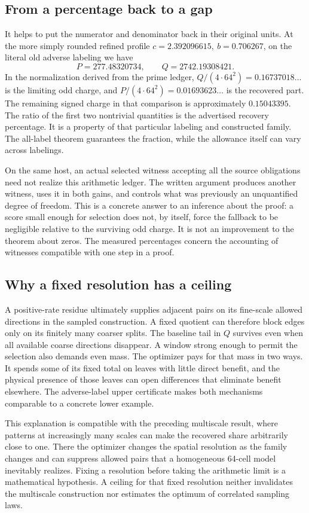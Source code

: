 \subsection{From a percentage back to a gap}
It helps to put the numerator and denominator back in their original units. At the more simply rounded refined profile \(c=2.392096615,\ b=0.706267\), on the literal old adverse labeling we have
\[
     P=277.48320734,\qquad Q=2742.19308421 .
\]
In the normalization derived from the prime ledger, \(Q/(4\cdot64^2)=0.16737018\ldots\) is the limiting odd charge, and \(P/(4\cdot64^2)=0.01693623\ldots\) is the recovered part. The remaining signed charge in that comparison is approximately \(0.15043395\). The ratio of the first two nontrivial quantities is the advertised recovery percentage. It is a property of that particular labeling and constructed family. The all-label theorem guarantees the fraction, while the allowance itself can vary across labelings.

On the same host, an actual selected witness accepting all the source obligations need not realize this arithmetic ledger. The written argument produces another witness, uses it in both gains, and controls what was previously an unquantified degree of freedom. This is a concrete answer to an inference about the proof: a score small enough for selection does not, by itself, force the fallback to be negligible relative to the surviving odd charge. It is not an improvement to the theorem about zeros. The measured percentages concern the accounting of witnesses compatible with one step in a proof.

\subsection{Why a fixed resolution has a ceiling}
A positive-rate residue ultimately supplies adjacent pairs on its fine-scale allowed directions in the sampled construction. A fixed quotient can therefore block edges only on its finitely many coarser splits. The baseline tail in \(Q\) survives even when all available coarse directions disappear. A window strong enough to permit the selection also demands even mass. The optimizer pays for that mass in two ways. It spends some of its fixed total on leaves with little direct benefit, and the physical presence of those leaves can open differences that eliminate benefit elsewhere. The adverse-label upper certificate makes both mechanisms comparable to a concrete lower example.

This explanation is compatible with the preceding multiscale result, where patterns at increasingly many scales can make the recovered share arbitrarily close to one. There the optimizer changes the spatial resolution as the family changes and can suppress allowed pairs that a homogeneous 64-cell model inevitably realizes. Fixing a resolution before taking the arithmetic limit is a mathematical hypothesis. A ceiling for that fixed resolution neither invalidates the multiscale construction nor estimates the optimum of correlated sampling laws.

